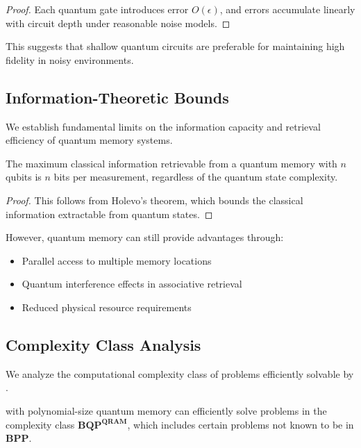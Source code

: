\begin{proof}
Each quantum gate introduces error $O(\epsilon)$, and errors accumulate linearly with circuit depth under reasonable noise models.
\end{proof}

This suggests that shallow quantum circuits are preferable for maintaining high fidelity in noisy environments.

\subsection{Information-Theoretic Bounds}

We establish fundamental limits on the information capacity and retrieval efficiency of quantum memory systems.

\begin{theorem}
\label{thm:info_bound}
The maximum classical information retrievable from a quantum memory with $n$ qubits is $n$ bits per measurement, regardless of the quantum state complexity.
\end{theorem}

\begin{proof}
This follows from Holevo's theorem, which bounds the classical information extractable from quantum states.
\end{proof}

However, quantum memory can still provide advantages through:
\begin{itemize}
    \item Parallel access to multiple memory locations
    \item Quantum interference effects in associative retrieval
    \item Reduced physical resource requirements
\end{itemize}

\subsection{Complexity Class Analysis}

We analyze the computational complexity class of problems efficiently solvable by \qmnn.

\begin{theorem}
\label{thm:computational_power}
\qmnn with polynomial-size quantum memory can efficiently solve problems in the complexity class $\mathbf{BQP}^{\mathbf{QRAM}}$, which includes certain problems not known to be in $\mathbf{BPP}$.
\end{theorem}

